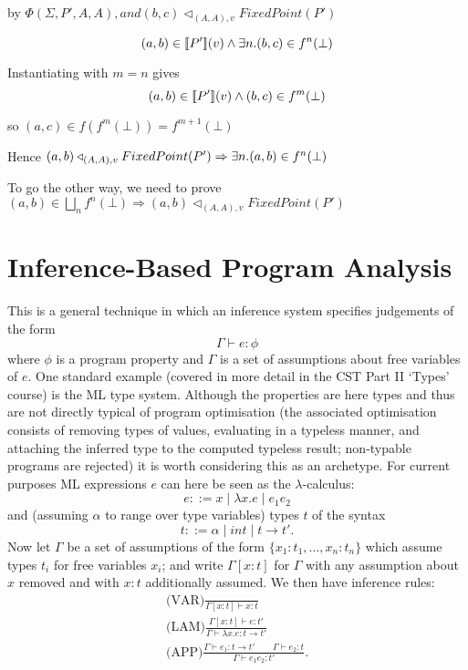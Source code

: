 \documentclass[twoside,a4paper,11pt]{article}
\newcommand{\db}[1]{{\bf [\![}#1{\bf ]\!]}}
\newcommand{\deno}[1]{\db{#1}(v)}
\newcommand{\denoRule}[2]{#1 \in \deno{#2}}
\newcommand{\opRule}[3]{#1 \triangleleft_{#2, v} #3}
\newcommand{\phiRule}[3]{\Phi(\Sigma, #1, #2, #3)}
\begin{document}
by $\phiRule{P'}{A}{A}, and \opRule{(b,c)}{(A,A)}{FixedPoint(P')}$

$$\denoRule{(a, b)}{P'} \wedge \exists n. (b, c) \in f^n(\bot)$$

Instantiating with $m = n$ gives
$$\denoRule{(a, b)}{P'} \wedge (b, c) \in f^m(\bot)$$

so $(a,c) \in f(f^m(\bot)) = f^{m+1}(\bot)$

Hence $\opRule{(a, b)}{(A, A)}{FixedPoint(P')} \Rightarrow \exists n. (a, b) \in f^n(\bot)\\\\ $

To go the other way, we need to prove $(a, b) \in \bigsqcup_nf^n(\bot) \Rightarrow \opRule{(a, b)}{(A, A)}{FixedPoint(P')}$



\section{Inference-Based Program Analysis}
This is a general technique in which an inference system specifies
judgements of the form
$$ \Gamma \vdash e:\phi$$
where $\phi$ is a program property and $\Gamma$ is a set of assumptions about
free variables of $e$.
One standard example (covered in more detail in the CST Part II `Types'
course) is the ML type system.  Although the properties are here types
and thus are not directly typical of program optimisation
(the associated optimisation consists of removing types of values,
evaluating in a typeless manner, and attaching the inferred type to the computed
typeless result; non-typable programs are rejected) it is worth considering
this as an archetype.
For current purposes ML expressions $e$ can here be seen
as the $\lambda$-calculus:
\[ e ::= x \mid \lambda x.e \mid e_1 e_2 \]
and (assuming $\alpha$ to range over type variables) types $t$ of the syntax
\[ t ::= \alpha \mid \mathit{int} \mid t \rightarrow t'. \]
Now let $\Gamma$ be a set of
assumptions of the form $\{x_1:t_1, \ldots, x_n:t_n\}$
which assume types $t_i$ for free variables $x_i$; and write $\Gamma[x:t]$
for $\Gamma$ with any assumption about $x$ removed and with $x:t$ additionally
assumed.
We then have inference rules:
\[ \begin{array}{c}
\displaystyle\mbox{(VAR)}\frac{}{\Gamma[x:t] \vdash x:t} \\[3ex]
\displaystyle\mbox{(LAM)}\frac{\Gamma[x:t] \vdash e:t'}
                     {\Gamma \vdash \lambda x.e:t\rightarrow t'} \\[3ex]
\displaystyle\mbox{(APP)}\frac{\Gamma \vdash e_1:t\rightarrow t'
                  \hspace{2em} \Gamma \vdash e_2:t}
                     {\Gamma \vdash e_1 e_2:t'}.
\end{array} \]
\end{document}
